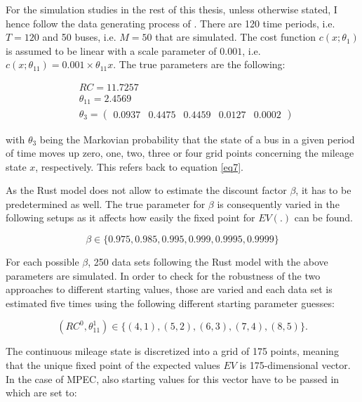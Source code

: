 For the simulation studies in the rest of this thesis, unless otherwise stated, I hence follow the data generating process of \citeauthor{Iskhakov.2016}. There are 120 time periods, i.e. $T=120$ and 50 buses, i.e. $M=50$ that are simulated. The cost function $c(x; \theta_1)$ is assumed to be linear with a scale parameter of $0.001$, i.e. $c(x; \theta_{11}) = 0.001 \times \theta_{11} x$. The true parameters are the following:

\begin{equation*}
	\begin{split}
		& RC = 11.7257 \\
		& \theta_{11} = 2.4569 \\
		& \theta_3 = \begin{pmatrix}
		0.0937 & 0.4475 & 0.4459 & 0.0127 & 0.0002
		\end{pmatrix}
	\end{split}
\end{equation*}

with $\theta_3$ being the Markovian probability that the state of a bus in a given period of time moves up zero, one, two, three or four grid points concerning the mileage state $x$, respectively. This refers back to equation \ref{eq7}.

As the Rust model does not allow to estimate the discount factor $\beta$, it has to be predetermined as well. The true parameter for $\beta$ is consequently varied in the following setups as it affects how easily the fixed point for $EV(.)$ can be found.

\begin{equation*}
	\beta \in \{0.975, 0.985, 0.995, 0.999, 0.9995, 0.9999\}
\end{equation*}

For each possible $\beta$, 250 data sets following the Rust model with the above parameters are simulated. In order to check for the robustness of the two approaches to different starting values, those are varied and each data set is estimated five times using the following different starting parameter guesses:

\begin{equation*}
	(RC^0, \theta^1_{11}) \in \{(4,1), (5, 2), (6, 3), (7, 4), (8, 5)\}.
\end{equation*}

The continuous mileage state is discretized into a grid of 175 points, meaning that the unique fixed point of the expected values $EV$ is 175-dimensional vector. In the case of MPEC, also starting values for this vector have to be passed in which are set to:

